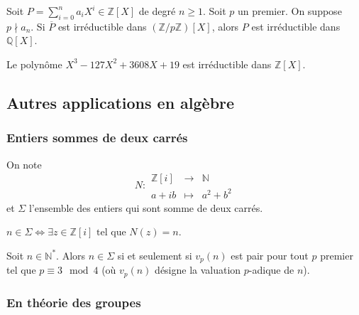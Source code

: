
	\begin{theorem}
		Soit $P = \sum_{i=0}^n a_i X^i \in \mathbb{Z}[X]$ de degré $n \geq 1$. Soit $p$ un premier. On suppose $p \nmid a_n$.
		\newpar
		Si $\overline{P}$ est irréductible dans $(\mathbb{Z}/p\mathbb{Z})[X]$, alors $P$ est irréductible dans $\mathbb{Q}[X]$.
	\end{theorem}

	\begin{example}
		Le polynôme $X^3-127X^2+3608X+19$ est irréductible dans $\mathbb{Z}[X]$.
	\end{example}

	\subsection{Autres applications en algèbre}

	\subsubsection{Entiers sommes de deux carrés}


	\begin{notation}
		On note \[ N :
		\begin{array}{ccc}
			\mathbb{Z}[i] &\rightarrow& \mathbb{N} \\
			a+ib &\mapsto& a^2 + b^2
		\end{array}
		\] et $\Sigma$ l'ensemble des entiers qui sont somme de deux carrés.
	\end{notation}

	\begin{remark}
		$n \in \Sigma \iff \exists z \in \mathbb{Z}[i] \text{ tel que } N(z)=n$.
	\end{remark}

	\begin{theorem}
		Soit $n \in \mathbb{N}^*$. Alors $n \in \Sigma$ si et seulement si $v_p(n)$ est pair pour tout $p$ premier tel que $p \equiv 3 \mod 4$ (où $v_p(n)$ désigne la valuation $p$-adique de $n$).
	\end{theorem}

	\subsubsection{En théorie des groupes}


